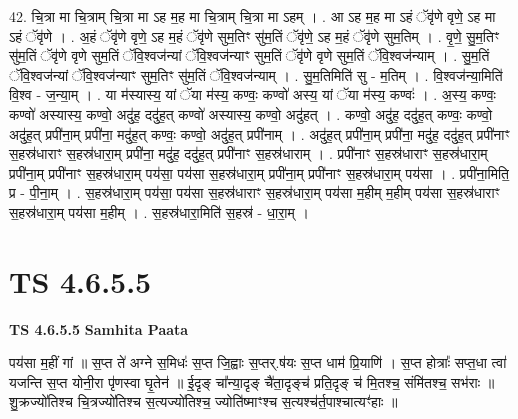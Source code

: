 \documentclass[17pt]{extarticle}
\begin{document}
42. चि॒त्रा मा चि॒त्राम् चि॒त्रा मा ऽह म॒ह मा चि॒त्राम् चि॒त्रा मा ऽहम् । . आ ऽह म॒ह मा ऽहं ॅवृ॑णे वृणे॒ ऽह मा ऽहं ॅवृ॑णे । . अ॒हं ॅवृ॑णे वृणे॒ ऽह म॒हं ॅवृ॑णे सुम॒तिꣳ सु॑म॒तिं ॅवृ॑णे॒ ऽह म॒हं ॅवृ॑णे सुम॒तिम् । . वृ॒णे॒ सु॒म॒तिꣳ सु॑म॒तिं ॅवृ॑णे वृणे सुम॒तिं ॅवि॒श्वज॑न्यां ॅवि॒श्वज॑न्याꣳ सुम॒तिं ॅवृ॑णे वृणे सुम॒तिं ॅवि॒श्वज॑न्याम् । . सु॒म॒तिं ॅवि॒श्वज॑न्यां ॅवि॒श्वज॑न्याꣳ सुम॒तिꣳ सु॑म॒तिं ॅवि॒श्वज॑न्याम् । . सु॒म॒तिमिति॑ सु - म॒तिम् । . वि॒श्वज॑न्या॒मिति॑ वि॒श्व - ज॒न्या॒म् । . या म॑स्यास्य॒ यां ॅया म॑स्य॒ कण्वः॒ कण्वो॑ अस्य॒ यां ॅया म॑स्य॒ कण्वः॑ । . अ॒स्य॒ कण्वः॒ कण्वो॑ अस्यास्य॒ कण्वो॒ अदु॑ह॒ ददु॑ह॒त् कण्वो॑ अस्यास्य॒ कण्वो॒ अदु॑हत् । . कण्वो॒ अदु॑ह॒ ददु॑ह॒त् कण्वः॒ कण्वो॒ अदु॑ह॒त् प्रपी॑ना॒म् प्रपी॑ना॒ मदु॑ह॒त् कण्वः॒ कण्वो॒ अदु॑ह॒त् प्रपी॑नाम् । . अदु॑ह॒त् प्रपी॑ना॒म् प्रपी॑ना॒ मदु॑ह॒ ददु॑ह॒त् प्रपी॑नाꣳ स॒हस्र॑धाराꣳ स॒हस्र॑धारा॒म् प्रपी॑ना॒ मदु॑ह॒ ददु॑ह॒त् प्रपी॑नाꣳ स॒हस्र॑धाराम् । . प्रपी॑नाꣳ स॒हस्र॑धाराꣳ स॒हस्र॑धारा॒म् प्रपी॑ना॒म् प्रपी॑नाꣳ स॒हस्र॑धारा॒म् पय॑सा॒ पय॑सा स॒हस्र॑धारा॒म् प्रपी॑ना॒म् प्रपी॑नाꣳ स॒हस्र॑धारा॒म् पय॑सा । . प्रपी॑ना॒मिति॒ प्र - पी॒ना॒म् । . स॒हस्र॑धारा॒म् पय॑सा॒ पय॑सा स॒हस्र॑धाराꣳ स॒हस्र॑धारा॒म् पय॑सा म॒हीम् म॒हीम् पय॑सा स॒हस्र॑धाराꣳ स॒हस्र॑धारा॒म् पय॑सा म॒हीम् । . स॒हस्र॑धारा॒मिति॑ स॒हस्र॑ - धा॒रा॒म् । \newline
\pagebreak
{}

\section{ TS 4.6.5.5 }

\textbf{TS 4.6.5.5 } \newline
\textbf{Samhita Paata} \newline

पय॑सा म॒हीं गां ॥ स॒प्त ते॑ अग्ने स॒मिधः॑ स॒प्त जि॒ह्वाः स॒प्तर्.ष॑यः स॒प्त धाम॑ प्रि॒याणि॑ । स॒प्त होत्राः᳚ सप्त॒धा त्वा॑ यजन्ति स॒प्त योनी॒रा पृ॑णस्वा घृ॒तेन॑ ॥ ई॒दृङ् चा᳚न्या॒दृङ् चै॑ता॒दृङ्च॑ प्रति॒दृङ् च॑ मि॒तश्च॒ संमि॑तश्च॒ सभ॑राः ॥ शु॒क्रज्यो॑तिश्च चि॒त्रज्यो॑तिश्च स॒त्यज्यो॑तिश्च॒ ज्योति॑ष्माꣳश्च स॒त्यश्च॑र्त॒पाश्चात्यꣳ॑हाः ॥ \newline
\end{document}
